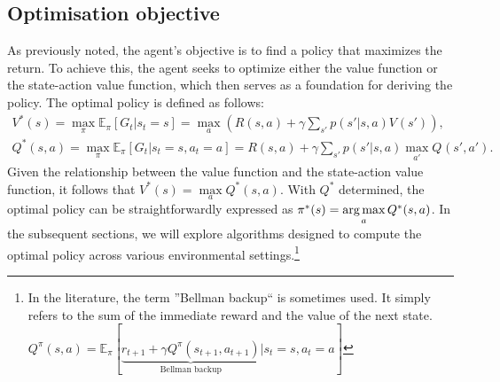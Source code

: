 \subsection{Optimisation objective}
As previously noted, the agent's objective is to find a policy that maximizes the return. To achieve this, the 
agent seeks to optimize either the value function or the state-action value function, which then serves as a 
foundation for deriving the policy. The optimal policy is defined as follows:
\begin{gather*}
V^*(s) = \max_{\pi} \mathbb{E}_{\pi}\left[G_t | s_t = s\right] = \max_{a} \left( R(s,a) + \gamma \sum_{s'} 
p(s'|s,a) V^{}(s') \right), \\
Q^*(s,a) = \max_{\pi} \mathbb{E}_{\pi}\left[G_t | s_t = s, a_t = a\right] = R(s,a) + \gamma \sum_{s'} p(s'|s,a) 
\max_{a'} Q^{}(s',a').
\end{gather*}
Given the relationship between the value function and the state-action value function, it follows that $V^*(s) = 
\max\limits_{a} Q^*(s,a)$. With $Q^*$ determined, the optimal policy can be straightforwardly expressed as $\pi^*
(s) = \operatorname*{arg\,max}\limits_{a} Q^*(s,a)$. In the subsequent sections, we will explore algorithms designed to compute 
the optimal policy across various environmental settings.\footnote{ In the literature, the term ''Bellman 
backup`` is sometimes used. It simply refers to the sum of the immediate reward and the value of the next state. 
$Q^{\pi}(s,a) =  \mathbb{E}_{\pi}[\underbrace{r_{t+1}+ \gamma Q^{\pi}(s_{t+1},a_{t+1})}_{\text{Bellman backup}} | 
s_t=s,a_t=a] $}